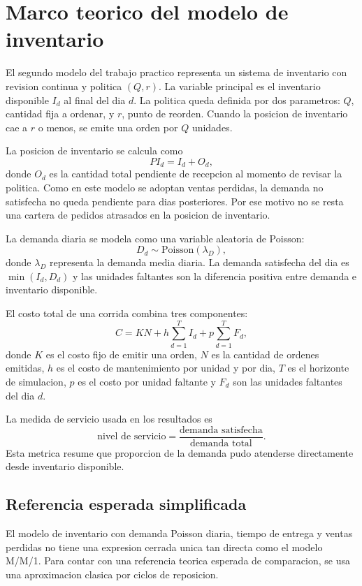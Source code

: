 \section{Marco teorico del modelo de inventario}

El segundo modelo del trabajo practico representa un sistema de inventario con revision continua y politica $(Q,r)$. La variable principal es el inventario disponible $I_d$ al final del dia $d$. La politica queda definida por dos parametros: $Q$, cantidad fija a ordenar, y $r$, punto de reorden. Cuando la posicion de inventario cae a $r$ o menos, se emite una orden por $Q$ unidades.

La posicion de inventario se calcula como
\[
    PI_d = I_d + O_d,
\]
donde $O_d$ es la cantidad total pendiente de recepcion al momento de revisar la politica. Como en este modelo se adoptan ventas perdidas, la demanda no satisfecha no queda pendiente para dias posteriores. Por ese motivo no se resta una cartera de pedidos atrasados en la posicion de inventario.

La demanda diaria se modela como una variable aleatoria de Poisson:
\[
    D_d \sim \mathrm{Poisson}(\lambda_D),
\]
donde $\lambda_D$ representa la demanda media diaria. La demanda satisfecha del dia es $\min(I_d, D_d)$ y las unidades faltantes son la diferencia positiva entre demanda e inventario disponible.

El costo total de una corrida combina tres componentes:
\[
    C = K N + h \sum_{d=1}^{T} I_d + p \sum_{d=1}^{T} F_d,
\]
donde $K$ es el costo fijo de emitir una orden, $N$ es la cantidad de ordenes emitidas, $h$ es el costo de mantenimiento por unidad y por dia, $T$ es el horizonte de simulacion, $p$ es el costo por unidad faltante y $F_d$ son las unidades faltantes del dia $d$.

La medida de servicio usada en los resultados es
\[
    \text{nivel de servicio} =
    \frac{\text{demanda satisfecha}}{\text{demanda total}}.
\]
Esta metrica resume que proporcion de la demanda pudo atenderse directamente desde inventario disponible.

\subsection{Referencia esperada simplificada}

El modelo de inventario con demanda Poisson diaria, tiempo de entrega y ventas perdidas no tiene una expresion cerrada unica tan directa como el modelo M/M/1. Para contar con una referencia teorica esperada de comparacion, se usa una aproximacion clasica por ciclos de reposicion.

